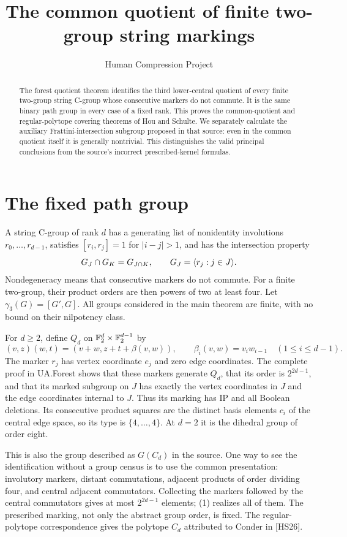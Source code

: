 
\title{The common quotient of finite two-group string markings}
\author{Human Compression Project}
\date{}

\maketitle
\begin{abstract}
The forest quotient theorem identifies the third lower-central quotient of
every finite two-group string C-group whose consecutive markers do not
commute. It is the same binary path group in every case of a fixed rank.
This proves the common-quotient and regular-polytope covering theorems of
Hou and Schulte. We separately calculate the auxiliary Frattini-intersection
subgroup proposed in that source: even in the common quotient itself it is
generally nontrivial. This distinguishes the valid principal conclusions
from the source's incorrect prescribed-kernel formulas.
\end{abstract}

\section{The fixed path group}
A string C-group of rank $d$ has a generating list of nonidentity involutions
$r_0,\ldots,r_{d-1}$, satisfies $[r_i,r_j]=1$ for $|i-j|>1$, and has
the intersection property
\[
 G_J\cap G_K=G_{J\cap K},\qquad G_J=\langle r_j:j\in J\rangle.
\]
Nondegeneracy means that consecutive markers do not commute. For a finite
two-group, their product orders are then powers of two at least four.
Let $\gamma_3(G)=[G',G]$. All groups considered in the main theorem are
finite, with no bound on their nilpotency class.

For $d\ge2$, define $Q_d$ on $\mathbb F_2^d\times\mathbb F_2^{d-1}$ by
\[
 (v,z)(w,t)=(v+w,z+t+\beta(v,w)),\qquad
 \beta_i(v,w)=v_iw_{i-1}\quad(1\le i\le d-1).              \tag{1}
\]
The marker $r_j$ has vertex coordinate $e_j$ and zero edge coordinates.
The complete proof in UA.Forest shows that these markers generate $Q_d$,
that its order is $2^{2d-1}$, and that its marked subgroup on $J$ has
exactly the vertex coordinates in $J$ and the edge coordinates internal
to $J$. Thus its marking has IP and all Boolean deletions. Its consecutive
product squares are the distinct basis elements $c_i$ of the central edge
space, so its type is $\{4,\ldots,4\}$. At $d=2$ it is the dihedral
group of order eight.

This is also the group described as $G(C_d)$ in the source. One way to see
the identification without a group census is to use the common presentation:
involutory markers, distant commutations, adjacent products of order dividing
four, and central adjacent commutators. Collecting the markers followed by
the central commutators gives at most $2^{2d-1}$ elements; (1) realizes all
of them. The prescribed marking, not only the abstract group order, is fixed.
The regular-polytope correspondence gives the polytope $C_d$ attributed to
Conder in [HS26].

